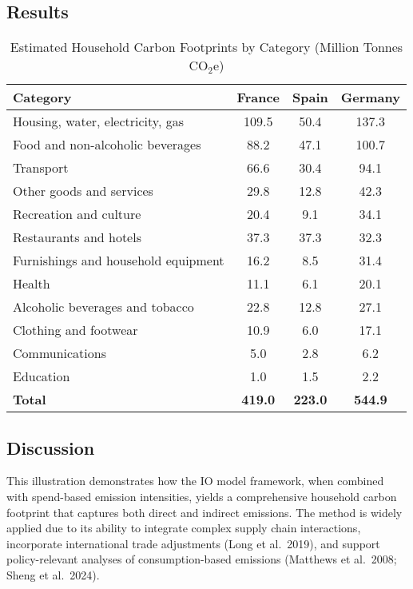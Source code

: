 \documentclass[12pt,a4paper]{article}%
\begin{document}
\subsection{Results}

\begin{table}[h]
\centering
\caption{Estimated Household Carbon Footprints by Category (Million Tonnes CO$_{2}$e)}
\label{tab:results}
\begin{tabular}{@{}lccc@{}}
\toprule
\textbf{Category} & \textbf{France} & \textbf{Spain} & \textbf{Germany}\\
\midrule
Housing, water, electricity, gas & 109.5 & 50.4 & 137.3\\
Food and non-alcoholic beverages & 88.2 & 47.1 & 100.7\\
Transport & 66.6 & 30.4 & 94.1\\
Other goods and services & 29.8 & 12.8 & 42.3\\
Recreation and culture & 20.4 & 9.1 & 34.1\\
Restaurants and hotels & 37.3 & 37.3 & 32.3\\
Furnishings and household equipment & 16.2 & 8.5 & 31.4\\
Health & 11.1 & 6.1 & 20.1\\
Alcoholic beverages and tobacco & 22.8 & 12.8 & 27.1\\
Clothing and footwear & 10.9 & 6.0 & 17.1\\
Communications & 5.0 & 2.8 & 6.2\\
Education & 1.0 & 1.5 & 2.2\\
\midrule
\textbf{Total} & \textbf{419.0} & \textbf{223.0} & \textbf{544.9}\\
\bottomrule
\end{tabular}
\end{table}

\subsection{Discussion}

This illustration demonstrates how the IO model framework, when combined with spend-based emission intensities, yields a comprehensive household carbon footprint that captures both direct and indirect emissions. The method is widely applied due to its ability to integrate complex supply chain interactions, incorporate international trade adjustments (Long et al.~2019), and support policy-relevant analyses of consumption-based emissions (Matthews et al.~2008; Sheng et al.~2024).
\end{document}
